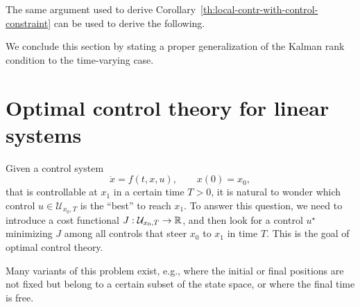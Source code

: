 The same argument used to derive Corollary~\ref{th:local-contr-with-control-constraint} can be used to derive the following.



We conclude this section by stating a proper generalization of the Kalman rank condition to the time-varying case.



\chapter{Optimal control theory for linear systems}

Given a control system 
\begin{equation}
    \dot x = f(t,x,u), \qquad x(0)=x_0,
\end{equation}
that is controllable at $x_1$ in a certain time $T>0$, it is natural to wonder which control $u\in \mathcal U_{x_0,T}$ is the ``best'' to reach $x_1$.
To answer this question, we need to introduce a cost functional $J:\mathcal U_{x_0,T} \to \mathbb{R}$, and then look for a control $u^\star$ minimizing $J$ among all controls that steer $x_0$ to $x_1$ in time $T$.
This is the goal of optimal control theory.

Many variants of this problem exist, e.g., where the initial or final positions are not fixed but belong to a certain subset of the state space, or where the final time is free.

